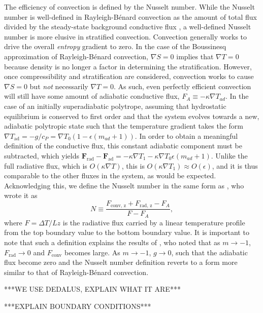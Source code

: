 \documentclass[aps, prl, twocolumn, groupedaddress]{revtex4-1}
\newcommand{\grad}{\ensuremath{\nabla}}
\newcommand{\RB}{Rayleigh-B\'{e}nard }
\begin{document}
The efficiency of convection is defined by the Nusselt number.  While the Nusselt number is well-defined in \RB convection
as the amount of total flux divided by the steady-state background conductive flux 
\cite{johnston&doering2009, otero&all2002},
a well-defined Nusselt number is more elusive in stratified convection.  Convection generally 
works to drive the overall \emph{entropy} gradient to zero.  In the case of the Boussinesq approximation of
\RB convection, $\grad S = 0$ implies that $\grad T = 0$ because density is no longer a factor in determining the
stratification.  However, once compressibility and stratification are considered, convection works to cause
$\grad S = 0$ but \emph{not} necessarily $\grad T = 0$.  As such, even perfectly efficient convection will still
have some amount of adiabatic conductive flux, $F_A \equiv -\kappa \grad T_{ad}$.  In the case of an initially
superadiabatic polytrope, assuming that hydrostatic equilibrium is conserved to first order and that the system
evolves towards a new, adiabatic polytropic state such that the temperature gradient takes the form
$\grad T_{\text{ad}} = -g/c_P = \grad T_0 (1 - \epsilon(m_{ad} + 1))$.  In order to obtain a meaningful definition
of the conductive flux, this constant adiabatic component must be subtracted, which yields
$\bm{F}_{\text{rad}} - \bm{F}_{\text{ad}} = -\kappa\grad T_1 -\kappa\grad T_0\epsilon(m_{ad} + 1)$.  Unlike
the full radiative flux, which is $O(\kappa\grad T)$, this is $O(\kappa\grad T_1) \approx O(\epsilon)$, and it
is thus comparable to the other fluxes in the system, as would be expected.  Acknowledging this, we define the
Nusselt number in the same form as \cite{hurlburt&all1984}, who wrote it as
\begin{equation}
N \equiv \frac{F_{\text{conv, z}} + F_{\text{rad, z}} - F_A}{F - F_A},
\label{eqn:nusselt}
\end{equation}
where $F = \Delta T / Lz$ is the radiative flux carried by a
linear temperature profile from the top boundary value to the bottom boundary value.
It is important to note that such a definition explains the results of \cite{brandenburg&all2005}, who noted that
as $m \rightarrow -1$, $F_{\text{rad}}\rightarrow 0$ and $F_{\text{conv}}$ becomes large.  As $m\rightarrow -1$,
$g\rightarrow 0$, such that the adiabatic flux become zero and the Nusselt number definition reverts to a form
more similar to that of \RB convection.

***WE USE DEDALUS, EXPLAIN WHAT IT ARE***

***EXPLAIN BOUNDARY CONDITIONS***
\end{document}
